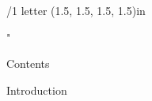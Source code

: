 % 




\margins/1 letter (1.5, 1.5, 1.5, 1.5)in %


\def\Auburn{}
\hyperlinks \Auburn \Blue

\let\title\tit
\let\capter\chap
\let\ssec\secc

\activettchar"

\def\tocline#1#2#3#4#5{{\leftskip=#1\iindent \rightskip=2\iindent
	\ifischap\advance\leftskip by\iindent\fi
	\ifnum#1>1 \advance\leftskip by 0.2\iindent\fi
	\toclinehook \noindent\llap{#2\toclink{#3}\enspace}%
		{#2#4}\nobreak\tocdotfill\pglink{#5}\nobreak\hskip-2\iindent\null\par}}

\def\titfont{\typobase\typoscale[\magstep2/\magstep2]\bcaps\bf}

\def\folio{\ifnum\pageno<2 \else\number\pageno \fi}

\overfullrule=0pt






\nonum\notoc\sec Contents

\maketoc

\sec Introduction

